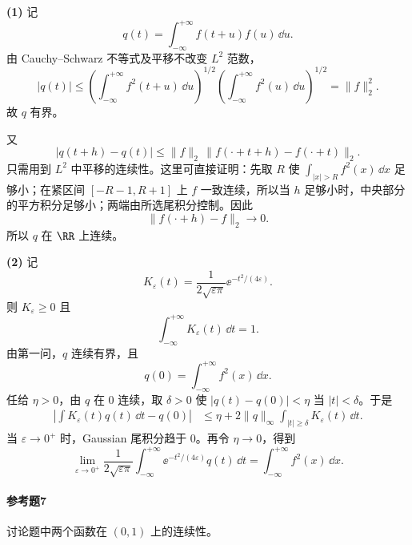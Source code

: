 \begin{xsolution}
\textbf{(1)} 记
\[
q(t)=\int_{-\infty}^{+\infty}f(t+u)f(u)\,\dd u.
\]
由 Cauchy--Schwarz 不等式及平移不改变 $L^2$ 范数，
\[
|q(t)|\leqslant
\left(\int_{-\infty}^{+\infty}f^2(t+u)\,\dd u\right)^{1/2}
\left(\int_{-\infty}^{+\infty}f^2(u)\,\dd u\right)^{1/2}
=\|f\|_2^2.
\]
故 $q$ 有界。

又
\[
|q(t+h)-q(t)|
\leqslant\|f\|_2\,
\|f(\cdot+t+h)-f(\cdot+t)\|_2.
\]
只需用到 $L^2$ 中平移的连续性。这里可直接证明：先取 $R$ 使
$\int_{|x|>R}f^2(x)\,\dd x$ 足够小；在紧区间 $[-R-1,R+1]$ 上 $f$ 一致连续，所以当 $h$ 足够小时，中央部分的平方积分足够小；两端由所选尾积分控制。因此
\[
\|f(\cdot+h)-f\|_2\to0.
\]
所以 $q$ 在 $\RR$ 上连续。

\textbf{(2)} 记
\[
K_\varepsilon(t)=\frac1{2\sqrt{\varepsilon\pi}}
\ee^{-t^2/(4\varepsilon)}.
\]
则 $K_\varepsilon\geqslant0$ 且
\[
\int_{-\infty}^{+\infty}K_\varepsilon(t)\,\dd t=1.
\]
由第一问，$q$ 连续有界，且
\[
q(0)=\int_{-\infty}^{+\infty}f^2(x)\,\dd x.
\]
任给 $\eta>0$，由 $q$ 在 $0$ 连续，取 $\delta>0$ 使
$|q(t)-q(0)|<\eta$ 当 $|t|<\delta$。于是
\[
\begin{aligned}
\left|\int K_\varepsilon(t)q(t)\,\dd t-q(0)\right|
&\leqslant\eta
+2\|q\|_\infty\int_{|t|\geqslant\delta}K_\varepsilon(t)\,\dd t.
\end{aligned}
\]
当 $\varepsilon\to0^+$ 时，Gaussian 尾积分趋于 $0$。再令 $\eta\to0$，得到
\[
\boxed{
\lim_{\varepsilon\to0^+}\frac1{2\sqrt{\varepsilon\pi}}
\int_{-\infty}^{+\infty}\ee^{-t^2/(4\varepsilon)}q(t)\,\dd t
=\int_{-\infty}^{+\infty}f^2(x)\,\dd x.}
\]
\end{xsolution}

\paragraph{参考题7}
讨论题中两个函数在 $(0,1)$ 上的连续性。

